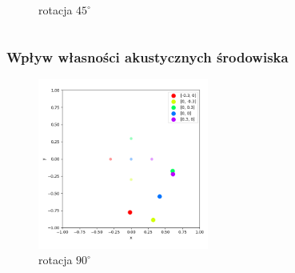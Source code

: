 \begin{frame}{}
\begin{columns}
\begin{column}{0.5\textwidth}
\begin{figure}
                \caption{rotacja $45^{\circ}$}
            \end{figure}
        \end{column}
    \end{columns}
\end{frame}

\begin{frame}
    \frametitle{Wpływ własności akustycznych środowiska}
    \begin{figure}
        \centering
        \includegraphics[width=0.5\textwidth]{../pics/mult_lat_2d_angle/positions_90_mean.png}
        \caption{rotacja $90^{\circ}$}
    \end{figure}
\end{frame}
